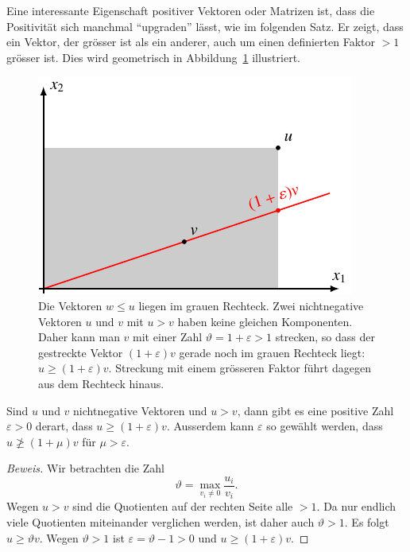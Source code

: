 Eine interessante Eigenschaft positiver Vektoren oder Matrizen
ist, dass die Positivität sich manchmal ``upgraden'' lässt, 
wie im folgenden Satz.
Er zeigt, dass ein Vektor, der grösser ist als ein anderer, auch
um einen definierten Faktor $>1$ grösser ist.
Dies wird geometrisch in 
Abbildung~\ref{buch:wahrscheinlichkeit:figure:trenn} illustriert.

\begin{figure}
\centering
\includegraphics{chapters/80-wahrscheinlichkeit/images/trenn.pdf}
\caption{Die Vektoren $w\le u$ liegen im grauen Rechteck.
Zwei nichtnegative Vektoren $u$ und $v$ mit $u>v$
haben keine gleichen Komponenten.
Daher kann man $v$ mit einer Zahl $\vartheta=1+\varepsilon > 1$
strecken, so dass der gestreckte Vektor $(1+\varepsilon)v$ gerade noch
im grauen Rechteck liegt: $u\ge (1+\varepsilon)v$.
Streckung mit einem grösseren Faktor führt dagegen aus dem Rechteck
hinaus.
\label{buch:wahrscheinlichkeit:figure:trenn}}
\end{figure}

\begin{satz}[Trenntrick]
\label{buch:wahrscheinlichkeit:satz:trenntrick}
%
Sind $u$ und $v$ nichtnegative Vektoren und $u>v$, dann gibt es eine
positive Zahl $\varepsilon>0$ derart, dass
$u\ge (1+\varepsilon)v$.
Ausserdem kann $\varepsilon$ so gewählt werden, dass $u\not\ge(1+\mu)v$
für $\mu>\varepsilon$.
\end{satz}

\begin{proof}[Beweis]
Wir betrachten die Zahl
\[
\vartheta
=
\max_{v_i\ne 0} \frac{u_i}{v_i}.
\]
Wegen $u>v$ sind die Quotienten auf der rechten Seite alle $>1$.
Da nur endlich viele Quotienten miteinander verglichen werden, ist
daher auch $\vartheta >1$.
Es folgt $u\ge \vartheta v$. 
Wegen $\vartheta >1$ ist $\varepsilon = \vartheta -1 >0$ und
$u\ge (1+\varepsilon)v$.
\end{proof}

